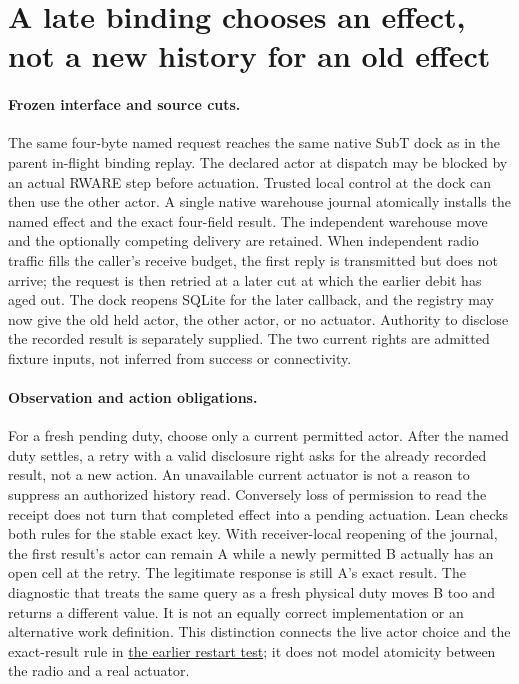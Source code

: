 \documentclass{article}
\begin{document}
\section*{A late binding chooses an effect, not a new history for an old effect}
\paragraph{Frozen interface and source cuts.}
The same four-byte named request reaches the same native SubT dock
as in the parent in-flight binding replay. The declared actor at
dispatch may be blocked by an actual RWARE step before actuation.
Trusted local control at the dock can then use the other actor.
A single native warehouse journal atomically installs the named
effect and the exact four-field result. The independent warehouse
move and the optionally competing delivery are retained.
When independent radio traffic fills the caller's receive budget,
the first reply is transmitted but does not arrive; the request is
then retried at a later cut at which the earlier debit has aged out.
The dock reopens SQLite for the later callback, and the registry
may now give the old held actor, the other actor, or no actuator.
Authority to disclose the recorded result is separately supplied.
The two current rights are admitted fixture inputs, not inferred
from success or connectivity.

\paragraph{Observation and action obligations.}
For a fresh pending duty, choose only a current permitted actor.
After the named duty settles, a retry with a valid disclosure
right asks for the already recorded result, not a new action.
An unavailable current actuator is not a reason to suppress an
authorized history read. Conversely loss of permission to read
the receipt does not turn that completed effect into a pending
actuation. Lean checks both rules for the stable exact key.
With receiver-local reopening of the journal, the first result's
actor can remain A while a newly permitted B actually has an open
cell at the retry. The legitimate response is still A's exact
result. The diagnostic that treats the same query as a fresh
physical duty moves B too and returns a different value. It is
not an equally correct implementation or an alternative work
definition. This distinction connects the live actor choice
and the exact-result rule in
\href{https://github.com/eternal-november/eos-research-programmes/pull/813}{the earlier restart test};
it does not model atomicity between the radio and a real actuator.
\end{document}
